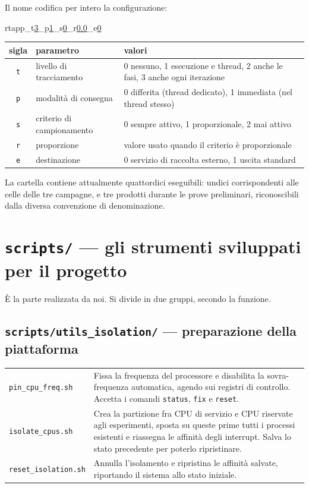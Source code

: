 \documentclass[11pt,a4paper]{article}
\begin{document}
Il nome codifica per intero la configurazione:

\begin{center}\ttfamily\large
rtapp\_t\underline{3}\_p\underline{1}\_s\underline{0}\_r\underline{0.0}\_e\underline{0}
\end{center}

\begin{center}\small
\begin{tabular}{clp{8.4cm}}
\toprule
\textbf{sigla} & \textbf{parametro} & \textbf{valori} \\
\midrule
\texttt{t} & livello di tracciamento & 0 nessuno, 1 esecuzione e thread, 2 anche le fasi, 3 anche ogni iterazione \\
\texttt{p} & modalit\`a di consegna & 0 differita (thread dedicato), 1 immediata (nel thread stesso) \\
\texttt{s} & criterio di campionamento & 0 sempre attivo, 1 proporzionale, 2 mai attivo \\
\texttt{r} & proporzione & valore usato quando il criterio \`e proporzionale \\
\texttt{e} & destinazione & 0 servizio di raccolta esterno, 1 uscita standard \\
\bottomrule
\end{tabular}
\end{center}

La cartella contiene attualmente quattordici eseguibili: undici corrispondenti alle celle delle tre
campagne, e tre prodotti durante le prove preliminari, riconoscibili dalla diversa convenzione di
denominazione.

\section{\texttt{scripts/} --- gli strumenti sviluppati per il progetto}

\`E la parte realizzata da noi. Si divide in due gruppi, secondo la funzione.

\subsection*{\texttt{scripts/utils\_isolation/} --- preparazione della piattaforma}

\begin{center}\small
\begin{tabular}{p{4.3cm}p{10.0cm}}
\toprule
\texttt{pin\_cpu\_freq.sh} & Fissa la frequenza del processore e disabilita la sovra-frequenza
automatica, agendo sui registri di controllo. Accetta i comandi \texttt{status}, \texttt{fix} e
\texttt{reset}. \\
\addlinespace
\texttt{isolate\_cpus.sh} & Crea la partizione fra CPU di servizio e CPU riservate agli esperimenti,
sposta su queste prime tutti i processi esistenti e riassegna le affinit\`a degli interrupt.
Salva lo stato precedente per poterlo ripristinare. \\
\addlinespace
\texttt{reset\_isolation.sh} & Annulla l'isolamento e ripristina le affinit\`a salvate,
riportando il sistema allo stato iniziale. \\
\bottomrule
\end{tabular}
\end{center}
\end{document}
